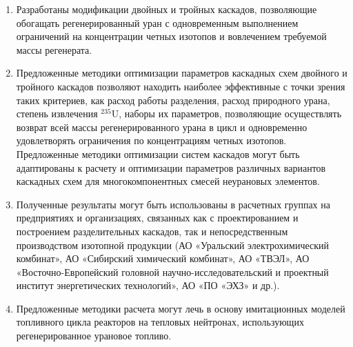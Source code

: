 {\influence} 
\begin{enumerate}
  \item Разработаны модификации двойных и тройных каскадов, позволяющие обогащать регенерированный уран с одновременным выполнением ограничений на концентрации четных изотопов и вовлечением требуемой массы регенерата.
  \item Предложенные методики оптимизации параметров каскадных схем двойного и тройного каскадов позволяют находить наиболее эффективные с точки зрения таких критериев, как расход работы разделения, расход природного урана, степень извлечения $^{235}$U, наборы их параметров, позволяющие осуществлять возврат всей массы регенерированного урана в цикл и одновременно удовлетворять ограничения по концентрациям четных изотопов. Предложенные методики оптимизации систем каскадов могут быть адаптированы к расчету и оптимизации параметров различных вариантов каскадных схем для многокомпонентных смесей неурановых элементов.
  \item Полученные результаты могут быть использованы в расчетных группах на предприятиях и организациях, связанных как с проектированием и построением разделительных каскадов, так и непосредственным производством изотопной продукции (АО «Уральский электрохимический комбинат», АО «Сибирский химический комбинат», АО «ТВЭЛ», АО «Восточно-Европейский головной научно-исследовательский и проектный институт энергетических технологий», АО «ПО «ЭХЗ» и др.). 
  \item Предложенные методики расчета могут лечь в основу имитационных моделей топливного цикла реакторов на тепловых нейтронах, использующих регенерированное урановое топливо.  
\end{enumerate}


